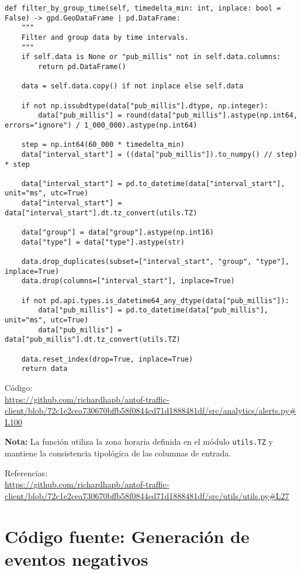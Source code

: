 \documentclass[12pt]{article}
\begin{document}
\begin{verbatim}
def filter_by_group_time(self, timedelta_min: int, inplace: bool = False) -> gpd.GeoDataFrame | pd.DataFrame:
    """
    Filter and group data by time intervals.
    """
    if self.data is None or "pub_millis" not in self.data.columns:
        return pd.DataFrame()

    data = self.data.copy() if not inplace else self.data

    if not np.issubdtype(data["pub_millis"].dtype, np.integer):
        data["pub_millis"] = round(data["pub_millis"].astype(np.int64, errors="ignore") / 1_000_000).astype(np.int64)

    step = np.int64(60_000 * timedelta_min)
    data["interval_start"] = ((data["pub_millis"]).to_numpy() // step) * step

    data["interval_start"] = pd.to_datetime(data["interval_start"], unit="ms", utc=True)
    data["interval_start"] = data["interval_start"].dt.tz_convert(utils.TZ)

    data["group"] = data["group"].astype(np.int16)
    data["type"] = data["type"].astype(str)

    data.drop_duplicates(subset=["interval_start", "group", "type"], inplace=True)
    data.drop(columns=["interval_start"], inplace=True)

    if not pd.api.types.is_datetime64_any_dtype(data["pub_millis"]):
        data["pub_millis"] = pd.to_datetime(data["pub_millis"], unit="ms", utc=True)
        data["pub_millis"] = data["pub_millis"].dt.tz_convert(utils.TZ)

    data.reset_index(drop=True, inplace=True)
    return data
\end{verbatim}

Código: \\
\url{https://github.com/richardhapb/antof-traffic-client/blob/72c1e2cea730670bffb58f0844cd71d1888481df/src/analytics/alerts.py#L100}

\noindent\textbf{Nota:}
La función utiliza la zona horaria definida en el módulo \texttt{utils.TZ} y mantiene la consistencia tipológica de las columnas de entrada.

Referencias: \\
\url{https://github.com/richardhapb/antof-traffic-client/blob/72c1e2cea730670bffb58f0844cd71d1888481df/src/utils/utils.py#L27}

\newpage

\section{Código fuente: Generación de eventos negativos}
\label{annex:neg_code}
\end{document}
